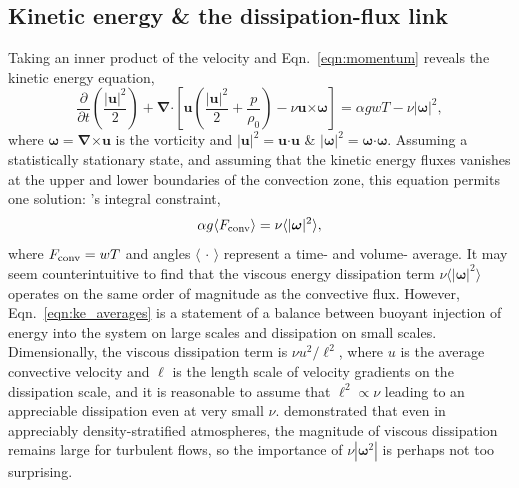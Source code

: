 \documentclass{aastex631}
\newcommand{\Fconv}{\ensuremath{F_{\rm{conv}}}}
\newcommand{\angles}[1]{\langle #1 \rangle}
\renewcommand{\vec}[1]{\boldsymbol{#1}}
\renewcommand{\dot}{\vec{\cdot}}
\newcommand{\grad}{\vec{\nabla}}
\newcommand{\cross}{\vec{\times}}
\begin{document}
\subsection{Kinetic energy \& the dissipation-flux link}
\label{sec:theory_energy}
Taking an inner product of the velocity and Eqn.~\ref{eqn:momentum} reveals the kinetic energy equation,
\begin{equation}
\frac{\partial}{\partial t}\left(\frac{|\vec{u}|^2}{2}\right) 
+ \grad\dot\left[\vec{u}\left(\frac{|\vec{u}|^2}{2} + \frac{p}{\rho_0}\right) - \nu\vec{u}\cross\vec{\omega}\right]
= \alpha g w T - \nu|\vec{\omega}|^2,
\label{eqn:kinetic_energy}
\end{equation}
where $\vec{\omega} = \grad\cross\vec{u}$ is the vorticity and $|\vec{u}|^2 = \vec{u}\dot\vec{u}$ \& $|\vec{\omega}|^2 = \vec{\omega}\dot\vec{\omega}$.
Assuming a statistically stationary state, and assuming that the kinetic energy fluxes vanishes at the upper and lower boundaries of the convection zone, this equation permits one solution: \citet{roxburgh1989}'s integral constraint,
\begin{equation}
\alpha g \angles{\Fconv} = \nu\angles{|\vec{\omega}|^2},
\label{eqn:ke_averages}
\end{equation}
where $\Fconv = w T$ and angles $\angles{\,\cdot\,}$ represent a time- and volume- average.
It may seem counterintuitive to find that the viscous energy dissipation term $\nu\angles{|\vec{\omega}|^2}$ operates on the same order of magnitude as the convective flux.
However, Eqn.~\ref{eqn:ke_averages} is a statement of a balance between buoyant injection of energy into the system on large scales and dissipation on small scales.
Dimensionally, the viscous dissipation term is $\nu u^2 / \ell^2$, where $u$ is the average convective velocity and $\ell$ is the length scale of velocity gradients on the dissipation scale, and it is reasonable to assume that $\ell^2 \propto \nu$ leading to an appreciable dissipation even at very small $\nu$.
\citet{currie_browning_2017} demonstrated that even in appreciably density-stratified atmospheres, the magnitude of viscous dissipation remains large for turbulent flows, so the importance of $\nu |\vec{\omega}^2|$ is perhaps not too surprising.
\end{document}
